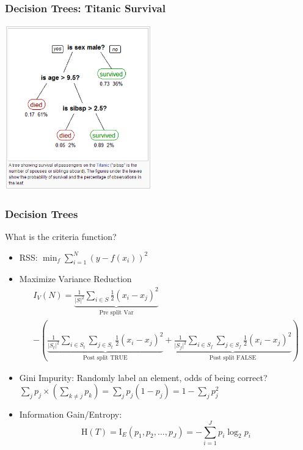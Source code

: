 \documentclass[xcolor=pdftex,dvipsnames,table,mathserif]{beamer}
\begin{document}
\begin{frame}
\frametitle{Decision Trees: Titanic Survival}
\includegraphics[width=2.5in]{./resources/titanic.png}
\end{frame}


\begin{frame}
\frametitle{Decision Trees}
\tiny
What is the criteria function?
\begin{itemize}
\item RSS: $\min_f \sum_{i=1}^N (y - f(x_i))^2$
\item Maximize Variance Reduction
\begin{align*}
I_{V}(N)=\underbrace{\frac{1}{|S|^{2}} \sum_{i \in S} \frac{1}{2}\left(x_{i}-x_{j}\right)^{2}}_{\text{Pre split Var}}\\
-\left( \underbrace{\frac{1}{\left|S_{t}\right|^{2}} \sum_{i \in S_{t}} \sum_{j \in S_{t}} \frac{1}{2}\left(x_{i}-x_{j}\right)^{2}}_{\text{Post split  TRUE}}
+\underbrace{\frac{1}{\left|S_{f}\right|^{2}} \sum_{i \in S_{f}} \sum_{j \in S_{f}} \frac{1}{2}\left(x_{i}-x_{j}\right)^{2}}_{\text{Post split FALSE}}
\right)
\end{align*}
\item Gini Impurity: Randomly label an element, odds of being correct? $\sum_j p_j \times ( \sum_{k \neq j} p_k ) =\sum_j p_j (1 -p_j) = 1 -\sum_j p_j^2  $ 
\item Information Gain/Entropy: $$\mathrm{H}(T)=\mathrm{I}_{E}\left(p_{1}, p_{2}, \ldots, p_{J}\right)=-\sum_{i=1}^{J} p_{i} \log _{2} p_{i}$$
\end{itemize}
\end{frame}
\end{document}
